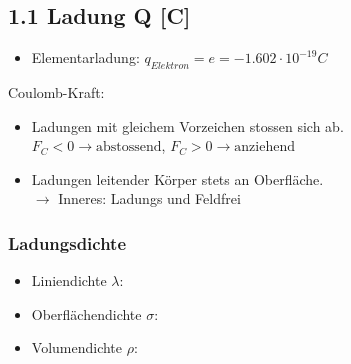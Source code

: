 \subsection*{1.1 Ladung Q [C]}

\begin{itemize}
    \item Elementarladung: $q_{Elektron} = e = - 1.602 \cdot 10^{-19}C$
\end{itemize}

Coulomb-Kraft: 

\begin{itemize}
    \item Ladungen mit gleichem Vorzeichen stossen sich ab.
    \\$F_C<0 \rightarrow \text{abstossend}$,
    $F_C>0 \rightarrow \text{anziehend}$
    \item Ladungen leitender Körper stets an Oberfläche.\\
    $\rightarrow$ Inneres: Ladungs und Feldfrei
\end{itemize}

\subsubsection*{Ladungsdichte}

\begin{itemize}
    \item Liniendichte $\lambda$: 
    \item Oberflächendichte $\sigma$: 
    \item Volumendichte $\rho$: 
\end{itemize}




